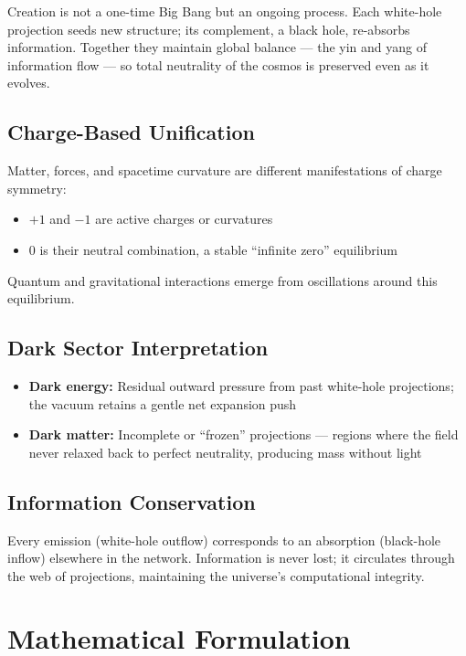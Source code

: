 \documentclass[11pt,a4paper]{article}
\begin{document}
Creation is not a one-time Big Bang but an ongoing process. Each white-hole projection seeds new structure; its complement, a black hole, re-absorbs information. Together they maintain global balance --- the yin and yang of information flow --- so total neutrality of the cosmos is preserved even as it evolves.

\subsection{Charge-Based Unification}

Matter, forces, and spacetime curvature are different manifestations of charge symmetry:
\begin{itemize}
\item $+1$ and $-1$ are active charges or curvatures
\item $0$ is their neutral combination, a stable ``infinite zero'' equilibrium
\end{itemize}

Quantum and gravitational interactions emerge from oscillations around this equilibrium.

\subsection{Dark Sector Interpretation}

\begin{itemize}
\item \textbf{Dark energy:} Residual outward pressure from past white-hole projections; the vacuum retains a gentle net expansion push
\item \textbf{Dark matter:} Incomplete or ``frozen'' projections --- regions where the field never relaxed back to perfect neutrality, producing mass without light
\end{itemize}

\subsection{Information Conservation}

Every emission (white-hole outflow) corresponds to an absorption (black-hole inflow) elsewhere in the network. Information is never lost; it circulates through the web of projections, maintaining the universe's computational integrity.

\section{Mathematical Formulation}
\end{document}
